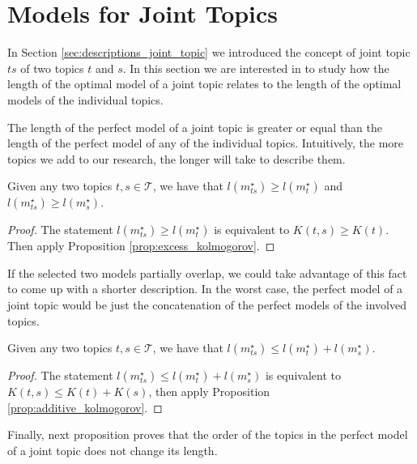 %
%

\section{Models for Joint Topics}
\label{sec:descriptions_joint_model}

In Section \ref{sec:descriptions_joint_topic} we introduced the concept of joint topic $ts$ of two topics $t$ and $s$. In this section we are interested in to study how the length of the optimal model of a joint topic relates to the length of the optimal models of the individual topics.

The length of the perfect model of a joint topic is greater or equal than the length of the perfect model of any of the individual topics. Intuitively, the more topics we add to our research, the longer will take to describe them.

\begin{proposition}
\label{prop:joint_length}
Given any two topics $t,s \in \mathcal{T}$, we have that $l \left( m_{ts}^{\star} \right) \geq l \left( m_{t}^{\star} \right)$ and $l \left( m_{ts}^{\star} \right) \geq l \left( m_{s}^{\star} \right)$.
\end{proposition}
\begin{proof}
The statement $l \left( m_{ts}^{\star} \right) \geq l \left( m_{t}^{\star} \right)$ is equivalent to $K(t,s) \geq K(t)$. Then apply Proposition \ref{prop:excess_kolmogorov}.
\end{proof}

If the selected two models partially overlap, we could take advantage of this fact to come up with a shorter description. In the worst case, the perfect model of a joint topic would be just the concatenation of the perfect models of the involved topics.

\begin{proposition}
\label{prop:joint_sum}
Given any two topics $t,s \in \mathcal{T}$, we have that $l \left( m_{ts}^{\star} \right) \leq l \left( m_{t}^{\star} \right) + l \left( m_{s}^{\star} \right)$.
\end{proposition}
\begin{proof}
The statement $l \left( m_{ts}^{\star} \right) \leq l \left( m_{t}^{\star} \right) + l \left( m_{s}^{\star} \right)$ is equivalent to $K(t,s) \leq K(t) + K(s)$, then apply Proposition \ref{prop:additive_kolmogorov}.
\end{proof}

Finally, next proposition proves that the order of the topics in the perfect model of a joint topic does not change its length.

